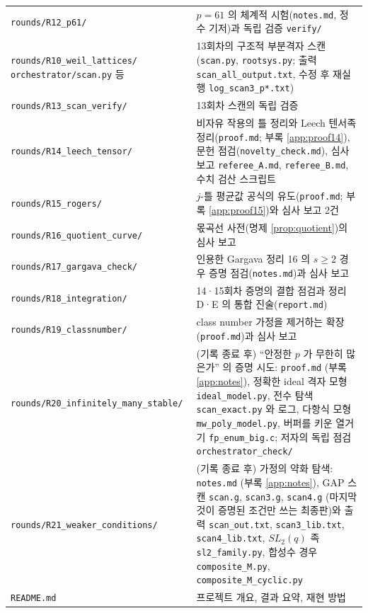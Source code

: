 \begin{center}
\begin{longtable}{@{}p{5.6cm}p{10.4cm}@{}}
\texttt{rounds/R12\_p61/} & $p=61$ 의 체계적 시험(\texttt{notes.md}, 정수 기저)과 독립 검증 \texttt{verify/}\\
\texttt{rounds/R10\_weil\_lattices/ orchestrator/scan.py} 등 & 13회차의 구조적 부분격자 스캔(\texttt{scan.py}, \texttt{rootsys.py}; 출력 \texttt{scan\_all\_output.txt}, 수정 후 재실행 \texttt{log\_scan3\_p*.txt})\\
\texttt{rounds/R13\_scan\_verify/} & 13회차 스캔의 독립 검증\\
\texttt{rounds/R14\_leech\_tensor/} & 비자유 작용의 틀 정리와 Leech 텐서족 정리(\texttt{proof.md}; 부록 \ref{app:proof14}), 문헌 점검(\texttt{novelty\_check.md}), 심사 보고 \texttt{referee\_A.md}, \texttt{referee\_B.md}, 수치 검산 스크립트\\
\texttt{rounds/R15\_rogers/} & $j$-틀 평균값 공식의 유도(\texttt{proof.md}; 부록 \ref{app:proof15})와 심사 보고 2건\\
\texttt{rounds/R16\_quotient\_curve/} & 몫곡선 사전(명제 \ref{prop:quotient})의 심사 보고\\
\texttt{rounds/R17\_gargava\_check/} & 인용한 Gargava 정리 16 의 $s\ge2$ 경우 증명 점검(\texttt{notes.md})과 심사 보고\\
\texttt{rounds/R18\_integration/} & 14·15회차 증명의 결합 점검과 정리 D·E 의 통합 진술(\texttt{report.md})\\
\texttt{rounds/R19\_classnumber/} & class number 가정을 제거하는 확장(\texttt{proof.md})과 심사 보고\\
\texttt{rounds/R20\_infinitely\_many\_stable/} & (기록 종료 후) ``안정한 $p$ 가 무한히 많은가'' 의 증명 시도: \texttt{proof.md} (부록 \ref{app:notes}), 정확한 ideal 격자 모형 \texttt{ideal\_model.py}, 전수 탐색 \texttt{scan\_exact.py} 와 로그, 다항식 모형 \texttt{mw\_poly\_model.py}, 버퍼를 키운 열거기 \texttt{fp\_enum\_big.c}; 저자의 독립 점검 \texttt{orchestrator\_check/}\\
\texttt{rounds/R21\_weaker\_conditions/} & (기록 종료 후) 가정의 약화 탐색: \texttt{notes.md} (부록 \ref{app:notes}), GAP 스캔 \texttt{scan.g}, \texttt{scan3.g}, \texttt{scan4.g} (마지막 것이 증명된 조건만 쓰는 최종판)와 출력 \texttt{scan\_out.txt}, \texttt{scan3\_lib.txt}, \texttt{scan4\_lib.txt}, $SL_2(q)$ 족 \texttt{sl2\_family.py}, 합성수 경우 \texttt{composite\_M.py}, \texttt{composite\_M\_cyclic.py}\\
\texttt{README.md} & 프로젝트 개요, 결과 요약, 재현 방법\\
\bottomrule
\end{longtable}
\end{center}
